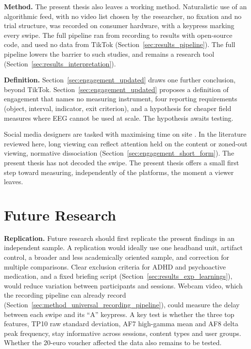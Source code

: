 \documentclass[12pt,a4paper]{report}
\begin{document}
\textbf{Method.} The present thesis also leaves a working method. Naturalistic use of an algorithmic feed, with no video list chosen by the researcher, no fixation and no trial structure, was recorded on consumer hardware, with a keypress marking every swipe. The full pipeline ran from recording to results with open-source code, and used no data from TikTok (Section~\ref{sec:results_pipeline}). The full pipeline lowers the barrier to such studies, and remains a research tool (Section~\ref{sec:results_interpretation}).

\textbf{Definition.} Section~\ref{sec:engagement_updated} draws one further conclusion, beyond TikTok. Section~\ref{sec:engagement_updated} proposes a definition of engagement that names no measuring instrument, four reporting requirements (object, interval, indicator, exit criterion), and a hypothesis for cheaper field measures where EEG cannot be used at scale. The hypothesis awaits testing.

Social media designers are tasked with maximising time on site \cite{baughan_i_2022}. In the literature reviewed here, long viewing can reflect attention held on the content or zoned-out viewing, normative dissociation (Section~\ref{sec:engagement_short_form}). The present thesis has not decoded the swipe. The present thesis offers a small first step toward measuring, independently of the platforms, the moment a viewer leaves.

\section{Future Research}
\label{sec:future_research}

\textbf{Replication.} Future research should first replicate the present findings in an independent sample. A replication would ideally use one headband unit, artifact control, a broader and less academically oriented sample, and correction for multiple comparisons. Clear exclusion criteria for ADHD and psychoactive medication, and a fixed briefing script (Section~\ref{sec:results_exp_learnings}), would reduce variation between participants and sessions. Webcam video, which the recording pipeline can already record (Section~\ref{sec:method_universal_recording_pipeline}), could measure the delay between each swipe and its ``A'' keypress. A key test is whether the three top features, TP10 raw standard deviation, AF7 high-gamma mean and AF8 delta peak frequency, stay informative across sessions, content types and user groups. Whether the 20-euro voucher affected the data also remains to be tested.
\end{document}
